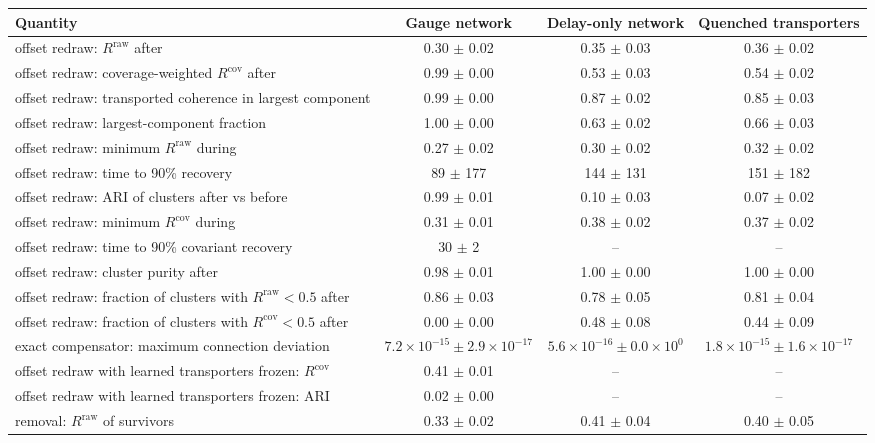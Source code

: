 \begin{tabular}{@{}lccc@{}}
\toprule
Quantity & Gauge network & Delay-only network & Quenched transporters \\
\midrule
offset redraw: $R^{\mathrm{raw}}$ after & 0.30 $\pm$ 0.02 & 0.35 $\pm$ 0.03 & 0.36 $\pm$ 0.02 \\
offset redraw: coverage-weighted $R^{\mathrm{cov}}$ after & 0.99 $\pm$ 0.00 & 0.53 $\pm$ 0.03 & 0.54 $\pm$ 0.02 \\
offset redraw: transported coherence in largest component & 0.99 $\pm$ 0.00 & 0.87 $\pm$ 0.02 & 0.85 $\pm$ 0.03 \\
offset redraw: largest-component fraction & 1.00 $\pm$ 0.00 & 0.63 $\pm$ 0.02 & 0.66 $\pm$ 0.03 \\
offset redraw: minimum $R^{\mathrm{raw}}$ during & 0.27 $\pm$ 0.02 & 0.30 $\pm$ 0.02 & 0.32 $\pm$ 0.02 \\
offset redraw: time to 90\% recovery & 89 $\pm$ 177 & 144 $\pm$ 131 & 151 $\pm$ 182 \\
offset redraw: ARI of clusters after vs before & 0.99 $\pm$ 0.01 & 0.10 $\pm$ 0.03 & 0.07 $\pm$ 0.02 \\
offset redraw: minimum $R^{\mathrm{cov}}$ during & 0.31 $\pm$ 0.01 & 0.38 $\pm$ 0.02 & 0.37 $\pm$ 0.02 \\
offset redraw: time to 90\% covariant recovery & 30 $\pm$ 2 & -- & -- \\
offset redraw: cluster purity after & 0.98 $\pm$ 0.01 & 1.00 $\pm$ 0.00 & 1.00 $\pm$ 0.00 \\
offset redraw: fraction of clusters with $R^{\mathrm{raw}}<0.5$ after & 0.86 $\pm$ 0.03 & 0.78 $\pm$ 0.05 & 0.81 $\pm$ 0.04 \\
offset redraw: fraction of clusters with $R^{\mathrm{cov}}<0.5$ after & 0.00 $\pm$ 0.00 & 0.48 $\pm$ 0.08 & 0.44 $\pm$ 0.09 \\
exact compensator: maximum connection deviation & $7.2\times 10^{-15} \pm 2.9\times 10^{-17}$ & $5.6\times 10^{-16} \pm 0.0\times 10^{0}$ & $1.8\times 10^{-15} \pm 1.6\times 10^{-17}$ \\
offset redraw with learned transporters frozen: $R^{\mathrm{cov}}$ & 0.41 $\pm$ 0.01 & -- & -- \\
offset redraw with learned transporters frozen: ARI & 0.02 $\pm$ 0.00 & -- & -- \\
removal: $R^{\mathrm{raw}}$ of survivors & 0.33 $\pm$ 0.02 & 0.41 $\pm$ 0.04 & 0.40 $\pm$ 0.05 \\

\end{tabular}
